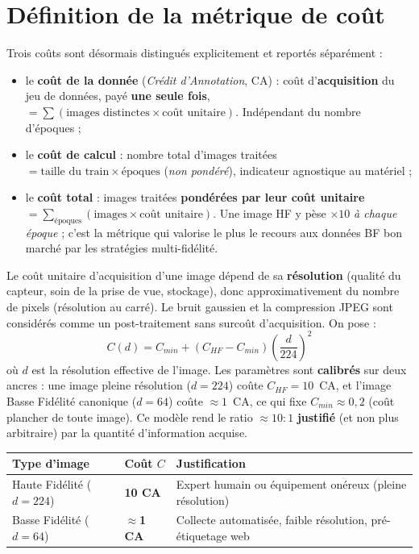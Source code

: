 \documentclass[11pt,a4paper,openany]{book}
\newcommand{\tableheadcolor}{\rowcolor{headerbg}}
\begin{document}
\section{Définition de la métrique de coût}\label{sec:cout}

Trois coûts sont désormais distingués explicitement et reportés séparément :

\begin{itemize}
  \item le \textbf{coût de la donnée} (\textit{Crédit d'Annotation}, CA) : coût d'\textbf{acquisition} du jeu de données, payé \textbf{une seule fois}, $= \sum (\text{images distinctes} \times \text{coût unitaire})$. Indépendant du nombre d'époques ;
  \item le \textbf{coût de calcul} : nombre total d'images traitées $= \text{taille du train} \times \text{époques}$ (\emph{non pondéré}), indicateur agnostique au matériel ;
  \item le \textbf{coût total} : images traitées \textbf{pondérées par leur coût unitaire} $= \sum_{\text{époques}} (\text{images} \times \text{coût unitaire})$. Une image HF y pèse $\times 10$ \emph{à chaque époque} ; c'est la métrique qui valorise le plus le recours aux données BF bon marché par les stratégies multi-fidélité.
\end{itemize}

Le coût unitaire d'acquisition d'une image dépend de sa \textbf{résolution} (qualité du capteur, soin de la prise de vue, stockage), donc approximativement du nombre de pixels (résolution au carré). Le bruit gaussien et la compression JPEG sont considérés comme un post-traitement sans surcoût d'acquisition. On pose :
\[
  C(d) = C_{min} + (C_{HF} - C_{min}) \left(\frac{d}{224}\right)^{2}
\]
où $d$ est la résolution effective de l'image. Les paramètres sont \textbf{calibrés} sur deux ancres : une image pleine résolution ($d=224$) coûte $C_{HF}=10$~CA, et l'image Basse Fidélité canonique ($d=64$) coûte $\approx 1$~CA, ce qui fixe $C_{min}\approx 0{,}2$ (coût plancher de toute image). Ce modèle rend le ratio $\approx 10\!:\!1$ \textbf{justifié} (et non plus arbitraire) par la quantité d'information acquise.

\renewcommand{\arraystretch}{1.4}
\begin{tabularx}{\linewidth}{L{3.8cm} C{2.6cm} L{9.1cm}}
  \toprule
  \tableheadcolor
  \textbf{Type d'image} & \textbf{Coût $C$} & \textbf{Justification} \\
  \midrule
  Haute Fidélité ($d=224$) & \textbf{10 CA} & Expert humain ou équipement onéreux (pleine résolution) \\
  Basse Fidélité ($d=64$) & \textbf{$\approx$1 CA} & Collecte automatisée, faible résolution, pré-étiquetage web \\
  \bottomrule
\end{tabularx}
\end{document}
